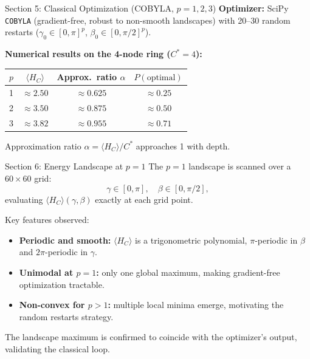 \documentclass{beamer}
\begin{document}
\begin{frame}
\begin{frame}{Section 5: Classical Optimization (COBYLA, $p=1,2,3$)}
\textbf{Optimizer:} SciPy \texttt{COBYLA} (gradient-free, robust to
non-smooth landscapes) with 20--30 random restarts
($\gamma_0 \in [0,\pi]^p$, $\beta_0 \in [0,\pi/2]^p$).

\medskip

\textbf{Numerical results on the 4-node ring ($C^* = 4$):}
\begin{center}
\small
\begin{tabular}{cccc}
\hline
$p$ & $\langle H_C\rangle$ & Approx.\ ratio $\alpha$ & $P(\text{optimal})$ \\
\hline
1 & $\approx 2.50$ & $\approx 0.625$ & $\approx 0.25$ \\
2 & $\approx 3.50$ & $\approx 0.875$ & $\approx 0.50$ \\
3 & $\approx 3.82$ & $\approx 0.955$ & $\approx 0.71$ \\
\hline
\end{tabular}
\end{center}

\medskip
Approximation ratio $\alpha = \langle H_C\rangle / C^*$ approaches 1 with depth.
\end{frame}


\begin{frame}{Section 6: Energy Landscape at $p=1$}
The $p=1$ landscape is scanned over a $60\times 60$ grid:
\[
  \gamma \in [0,\pi], \quad \beta \in [0,\pi/2],
\]
evaluating $\langle H_C\rangle(\gamma,\beta)$ exactly at each grid point.

\medskip

Key features observed:
\begin{itemize}
  \item \textbf{Periodic and smooth:} $\langle H_C\rangle$ is a trigonometric
    polynomial, $\pi$-periodic in $\beta$ and $2\pi$-periodic in $\gamma$.
  \item \textbf{Unimodal at $p=1$:} only one global maximum, making
    gradient-free optimization tractable.
  \item \textbf{Non-convex for $p>1$:} multiple local minima emerge,
    motivating the random restarts strategy.
\end{itemize}

\medskip

The landscape maximum is confirmed to coincide with the optimizer's
output, validating the classical loop.
\end{frame}



\end{frame}
\end{document}
